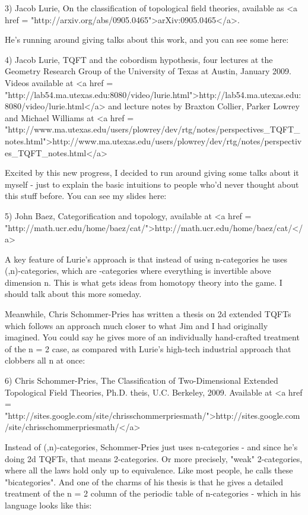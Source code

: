 3) Jacob Lurie, On the classification of topological field theories,
available as <a href = "http://arxiv.org/abs/0905.0465">arXiv:0905.0465</a>.

He's running around giving talks about this work, and you can see some
here:

4) Jacob Lurie, TQFT and the cobordism hypothesis, four lectures at
the Geometry Research Group of the University of Texas at Austin,
January 2009.  Videos available at 
<a href = "http://lab54.ma.utexas.edu:8080/video/lurie.html">http://lab54.ma.utexas.edu:8080/video/lurie.html</a>
and lecture notes by Braxton Collier, Parker Lowrey and Michael 
Williams at
<a href = "http://www.ma.utexas.edu/users/plowrey/dev/rtg/notes/perspectives_TQFT_notes.html">http://www.ma.utexas.edu/users/plowrey/dev/rtg/notes/perspectives_TQFT_notes.html</a>

Excited by this new progress, I decided to run around giving some 
talks about it myself - just to explain the basic intuitions to 
people who'd never thought about this stuff before.  You can see
my slides here:

5) John Baez, Categorification and topology, available at
<a href = "http://math.ucr.edu/home/baez/cat/">http://math.ucr.edu/home/baez/cat/</a>

A key feature of Lurie's approach is that instead of using
n-categories he uses (\infty ,n)-categories, which are
\infty -categories where everything is invertible above dimension n.
This is what gets ideas from homotopy theory into the game.
I should talk about this more someday.

Meanwhile, Chris Schommer-Pries has written a thesis on 2d extended
TQFTs which follows an approach much closer to what Jim and I had originally
imagined.  You could say he gives more of an individually hand-crafted
treatment of the n = 2 case, as compared with Lurie's high-tech industrial 
approach that clobbers all n at once:

6) Chris Schommer-Pries, The Classification of Two-Dimensional 
Extended Topological Field Theories, Ph.D. theis, U.C. Berkeley, 2009.
Available at <a href = "http://sites.google.com/site/chrisschommerpriesmath/">http://sites.google.com/site/chrisschommerpriesmath/</a>

Instead of (\infty ,n)-categories, Schommer-Pries just uses n-categories - 
and since he's doing 2d TQFTs, that means 2-categories.
Or more precisely, "weak" 2-categories, where all the laws hold
only up to equivalence.  Like most people, he calls these 
"bicategories".  And one of the charms of his thesis is that he 
gives a detailed treatment of the n = 2 column of the periodic
table of n-categories - which in his language looks like this:

